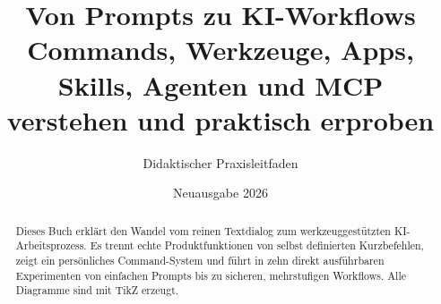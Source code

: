 \documentclass[11pt,a4paper]{scrreprt}
\title{\Huge\bfseries Von Prompts zu KI-Workflows\\[6mm]\Large Commands, Werkzeuge, Apps, Skills, Agenten und MCP verstehen und praktisch erproben}
\author{Didaktischer Praxisleitfaden}\date{Neuausgabe 2026}
\begin{document}
\maketitle
\begin{abstract}
Dieses Buch erklärt den Wandel vom reinen Textdialog zum werkzeuggestützten KI-Arbeitsprozess. Es trennt echte Produktfunktionen von selbst definierten Kurzbefehlen, zeigt ein persönliches Command-System und führt in zehn direkt ausführbaren Experimenten von einfachen Prompts bis zu sicheren, mehrstufigen Workflows. Alle Diagramme sind mit TikZ erzeugt.
\end{abstract}
\tableofcontents












\appendix


\end{document}
